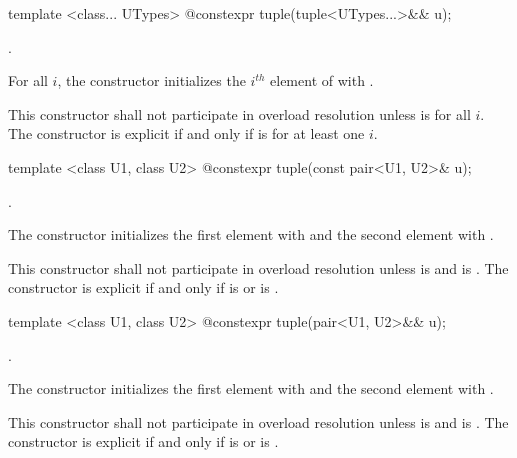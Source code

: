 %
\begin{itemdecl}
template <class... UTypes> @\EXPLICIT@ constexpr tuple(tuple<UTypes...>&& u);
\end{itemdecl}

\begin{itemdescr}
\pnum
\requires
{} \tcode{==} .

\pnum
\effects For all $i$, the constructor
initializes the $i^{th}$ element of  with
.

\pnum
\remarks This constructor shall not participate in overload resolution unless
 is  for all $i$.
The constructor is explicit if and only if
 is 
for at least one $i$.
\end{itemdescr}

%
%
\begin{itemdecl}
template <class U1, class U2> @\EXPLICIT@ constexpr tuple(const pair<U1, U2>& u);
\end{itemdecl}

\begin{itemdescr}
\pnum
\requires {}.

\pnum
\effects The constructor initializes the first element with  and the
second element with .

\pnum
\remarks This constructor shall not participate in overload resolution unless
 is  and
 is .
The constructor is explicit if and only if
 is  or
 is .
\end{itemdescr}

%
%
\begin{itemdecl}
template <class U1, class U2> @\EXPLICIT@ constexpr tuple(pair<U1, U2>&& u);
\end{itemdecl}

\begin{itemdescr}
\pnum
\requires {}.

\pnum
\effects The constructor initializes the first element with
 and the
second element with .

\pnum
\remarks This constructor shall not participate in overload resolution unless
 is  and
 is .
The constructor is explicit if and only if
 is  or
 is .
\end{itemdescr}

